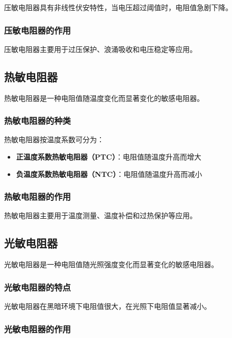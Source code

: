\documentclass[12pt,UTF8]{ctexbook}
\begin{document}
压敏电阻器具有非线性伏安特性，当电压超过阈值时，电阻值急剧下降。

\subsubsection{压敏电阻器的作用}

压敏电阻器主要用于过压保护、浪涌吸收和电压稳定等应用。

\subsection{热敏电阻器}

热敏电阻器是一种电阻值随温度变化而显著变化的敏感电阻器。

\subsubsection{热敏电阻器的种类}

热敏电阻器按温度系数可分为：

\begin{itemize}[leftmargin=2cm]
	\item \textbf{正温度系数热敏电阻器（PTC）}：电阻值随温度升高而增大
	\item \textbf{负温度系数热敏电阻器（NTC）}：电阻值随温度升高而减小
\end{itemize}

\subsubsection{热敏电阻器的作用}

热敏电阻器主要用于温度测量、温度补偿和过热保护等应用。

\subsection{光敏电阻器}

光敏电阻器是一种电阻值随光照强度变化而显著变化的敏感电阻器。

\subsubsection{光敏电阻器的特点}

光敏电阻器在黑暗环境下电阻值很大，在光照下电阻值显著减小。

\subsubsection{光敏电阻器的作用}
\end{document}

